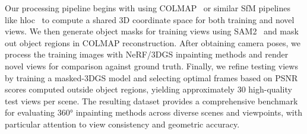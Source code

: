 \vspace{3pt}
\label{sec:data_preprocessing}
Our processing pipeline begins with using COLMAP~\citep{schoenberger2016sfm,schoenberger2016mvs} or similar SfM pipelines like hloc~\citep{sarlin2019coarse,sarlin2020superglue} to compute a shared 3D coordinate space for both training and novel views. We then generate object masks for training views using SAM2~\citep{ravi2024sam2} and mask out object regions in COLMAP reconstruction. After obtaining camera poses, we process the training images with NeRF/3DGS inpainting methods and render novel views for comparison against ground truth. Finally, we refine testing views by training a masked-3DGS model and selecting optimal frames based on PSNR scores computed outside object regions, yielding approximately 30 high-quality test views per scene. The resulting dataset provides a comprehensive benchmark for evaluating 360° inpainting methods across diverse scenes and viewpoints, with particular attention to view consistency and geometric accuracy.



